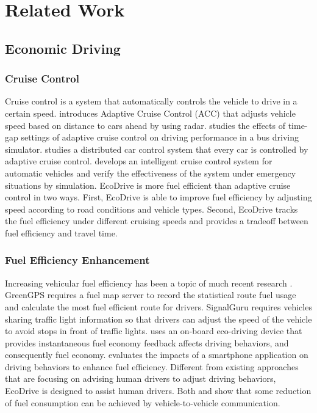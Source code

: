 
\chapter{Related Work}

\section{Economic Driving}

\subsection{Cruise Control}

Cruise control \cite{cruise_control} is a system that automatically
controls the vehicle to drive in a certain speed. 
\cite{bengtsson2001adaptive} introduces Adaptive Cruise Control (ACC)
that adjusts vehicle speed based on distance to cars ahead
by using radar. 
\cite{lin2009effects} studies the effects of time-gap
settings of adaptive cruise control on driving performance
in a bus driving simulator. 
\cite{loos2011adaptive} studies a distributed car control system
that every car is controlled by adaptive cruise control. 
\cite{ioannou1993autonomous} develops an intelligent cruise control system 
for automatic vehicles and verify the effectiveness of the system
under emergency situations by simulation.  
EcoDrive is more fuel efficient than adaptive cruise control 
in two ways. 
First, EcoDrive is able to improve fuel efficiency by 
adjusting speed according to road conditions and vehicle types. 
Second, EcoDrive tracks the fuel efficiency under different cruising
speeds and provides a tradeoff between fuel efficiency and travel time. 

\subsection{Fuel Efficiency Enhancement}

Increasing vehicular fuel efficiency has been a topic 
of much recent research \cite{ganti2010greengps, koukoumidis2011signalguru, 
boriboonsomsin2010eco, tulusan2012providing}.
GreenGPS \cite{ganti2010greengps} requires a fuel map server
to record the statistical route fuel usage and calculate the most
fuel efficient route for drivers. 
SignalGuru \cite{koukoumidis2011signalguru} requires vehicles sharing
traffic light information so that drivers can adjust the speed of
the vehicle to avoid stops in front of traffic lights. 
\cite{boriboonsomsin2010eco} uses an on-board eco-driving device 
that provides instantaneous fuel economy
feedback affects driving behaviors, and consequently fuel economy. 
\cite{tulusan2012providing} evaluates the impacts of a smartphone application
on driving behaviors to enhance fuel efficiency. 
Different from existing approaches that are focusing on advising human drivers to adjust driving behaviors, 
EcoDrive is designed to assist human drivers.
Both \cite{lang2013opportunities} and \cite{lang2014prediction} show that some reduction of fuel consumption can be achieved
by vehicle-to-vehicle communication. 


